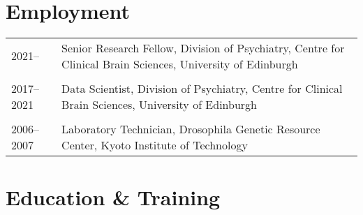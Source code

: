 \documentclass[11pt]{article}
\begin{document}

\noindent{\rule{\textwidth}{1pt}} \\


\section*{Employment}

\begin{tabular}{p{3cm}p{12cm}}
2021-- & Senior Research Fellow, Division of Psychiatry, Centre for Clinical Brain Sciences, University of Edinburgh \\ \\

2017--2021 & Data Scientist, Division of Psychiatry, Centre for Clinical Brain Sciences, University of Edinburgh \\ \\

2006--2007 & Laboratory Technician, Drosophila Genetic Resource Center, Kyoto Institute of Technology

\end{tabular}

\section*{Education \& Training}
\end{document}

